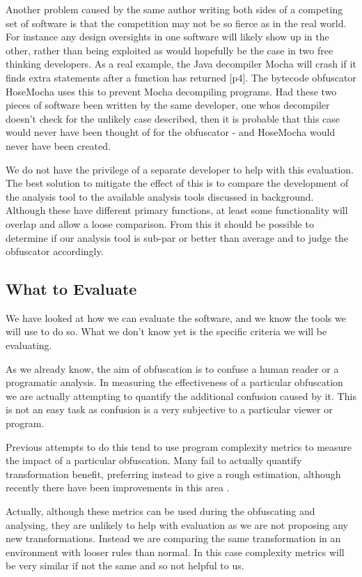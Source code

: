 \documentclass{report}
\begin{document}
Another problem caused by the same author writing both sides of a competing set of software is that the competition
may not be so fierce as in the real world. For instance any design oversights in one software will likely show up
in the other, rather than being exploited as would hopefully be the case in two free thinking developers. As a real
example, the Java decompiler Mocha will crash if it finds extra statements after a function has returned
\cite{hosemocha}[p4]. The bytecode obfuscator HoseMocha uses this to prevent Mocha decompiling programs. Had these two
pieces of software been written by the same developer, one whos decompiler doesn't check for the unlikely case described,
then it is probable that this case would never have been thought of for the obfuscator - and HoseMocha would never have
been created.

We do not have the privilege of a separate developer to help with this evaluation. The best solution to mitigate the effect
of this is to compare the development of the analysis tool to the available analysis tools discussed in background. Although
these have different primary functions, at least some functionality will overlap and allow a loose comparison. From this it
should be possible to determine if our analysis tool is sub-par or better than average and to judge the obfuscator
accordingly.

\subsection{What to Evaluate}

We have looked at how we can evaluate the software, and we know the tools we will use to do so. What we don't know yet is
the specific criteria we will be evaluating. 

As we already know, the aim of obfuscation is to confuse a human reader or a programatic analysis. In measuring the effectiveness
of a particular obfuscation we are actually attempting to quantify the additional confusion caused by it. This is not an easy task
as confusion is a very subjective to a particular viewer or program.

Previous attempts to do this tend to use program complexity metrics to measure the impact of a particular obfuscation. Many fail to
actually quantify transformation benefit, preferring instead to give a rough estimation, although recently there have been improvements in
this area \cite{obfquant}.

Actually, although these metrics can be used during the obfuscating and analysing, they are unlikely to help with evaluation as we are
not proposing any new transformations. Instead we are comparing the same transformation in an environment with looser rules than normal.
In this case complexity metrics will be very similar if not the same and so not helpful to us.
\end{document}
